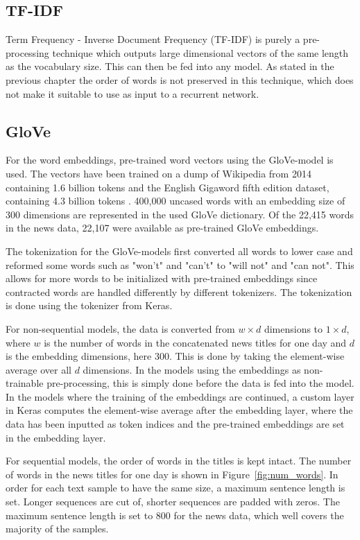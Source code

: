 \subsection{TF-IDF}

Term Frequency - Inverse Document Frequency (TF-IDF) is purely a pre-processing technique which outputs large dimensional vectors of the same length as the vocabulary size. This can then be fed into any model. As stated in the previous chapter the order of words is not preserved in this technique, which does not make it suitable to use as input to a recurrent network. 

\subsection{GloVe}

For the word embeddings, pre-trained word vectors using the GloVe-model is used. The vectors have been trained on a dump of Wikipedia from 2014 containing 1.6 billion tokens and the English Gigaword fifth edition dataset, containing 4.3 billion tokens \citep{pennington2014glove}. 400,000 uncased words with an embedding size of 300 dimensions are represented in the used GloVe dictionary. Of the 22,415 words in the news data, 22,107 were available as pre-trained GloVe embeddings. 

The tokenization for the GloVe-models first converted all words to lower case and reformed some words such as "won't" and "can't" to "will not" and "can not". This allows for more words to be initialized with pre-trained embeddings since contracted words are handled differently by different tokenizers. The tokenization is done using the tokenizer from Keras.  

For non-sequential models, the data is converted from $w \times d$ dimensions to $1 \times d$, where $w$ is the number of words in the concatenated news titles for one day and $d$ is the embedding dimensions, here 300. This is done by taking the element-wise average over all $d$ dimensions. In the models using the embeddings as non-trainable pre-processing, this is simply done before the data is fed into the model. In the models where the training of the embeddings are continued, a custom layer in Keras computes the element-wise average after the embedding layer, where the data has been inputted as token indices and the pre-trained embeddings are set in the embedding layer.

For sequential models, the order of words in the titles is kept intact. The number of words in the news titles for one day is shown in Figure~\ref{fig:num_words}. In order for each text sample to have the same size, a maximum sentence length is set. Longer sequences are cut of, shorter sequences are padded with zeros. The maximum sentence length is set to 800 for the news data, which well covers the majority of the samples. 

